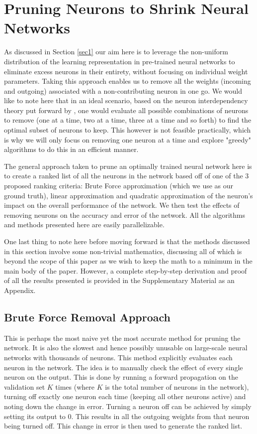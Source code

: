 \section{Pruning Neurons to Shrink Neural Networks}\label{sec2}
As discussed in Section \ref{sec1} our aim here is to leverage the non-uniform distribution of the learning representation in pre-trained neural networks to eliminate excess neurons in their entirety, without focusing on individual weight parameters. Taking this approach enables us to remove all the weights (incoming and outgoing) associated with a non-contributing neuron in one go. We would like to note here that in an ideal scenario, based on the neuron interdependency theory put forward by \cite{mozer1989skeletonization}, one would evaluate all possible combinations of neurons to remove (one at a time, two at a time, three at a time and so forth) to find the optimal subset of neurons to keep. This however is not feasible practically, which is why we will only focus on removing one neuron at a time and explore "greedy" algorithms to do this in an efficient manner.

The general approach taken to prune an optimally trained neural network here is to create a ranked list of all the neurons in the network based off of one of the 3 proposed ranking criteria: Brute Force approximation (which we use as our ground truth), linear approximation and quadratic approximation of the neuron's impact on the overall performance of the network. We then test the effects of removing neurons on the accuracy and error of the network. All the algorithms and methods presented here are easily parallelizable. 

One last thing to note here before moving forward is that the methods discussed in this section involve some non-trivial mathematics, discussing all of which is beyond the scope of this paper as we wish to keep the math to a minimum in the main body of the paper. However, a complete step-by-step derivation and proof of all the results presented is provided in the Supplementary Material as an Appendix.

\subsection{Brute Force Removal Approach}
This is perhaps the most naive yet the most accurate method for pruning the network. It is also the slowest and hence possibly unusable on large-scale neural networks with thousands of neurons. This method explicitly evaluates each neuron in the network. The idea is to manually check the effect of every single neuron on the output. This is done by running a forward propagation on the validation set $K$ times (where $K$ is the total number of neurons in the network), turning off exactly one neuron each time (keeping all other neurons active) and noting down the change in error. Turning a neuron off can be achieved by simply setting its output to 0. This results in all the outgoing weights from that neuron being turned off. This change in error is then used to generate the ranked list. 




